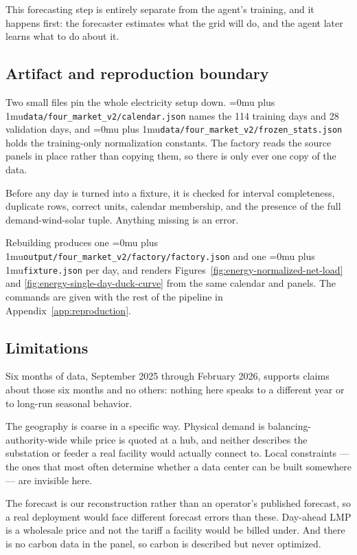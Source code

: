 ﻿\documentclass[12pt]{article}
\newcommand{\codepath}[1]{{\Urlmuskip=0mu plus 1mu\relax\nolinkurl{#1}}}
\begin{document}
This forecasting step is entirely separate from the agent's training, and it
happens first: the forecaster estimates what the grid will do, and the agent
later learns what to do about it.

\subsection{Artifact and reproduction boundary}
\label{subsec:energy-reproduction}

Two small files pin the whole electricity setup down.
\codepath{data/four_market_v2/calendar.json} names the 114 training days and 28
validation days, and \codepath{data/four_market_v2/frozen_stats.json} holds the
training-only normalization constants. The factory reads the source panels
in place rather than copying them, so there is only ever one copy of the data.

Before any day is turned into a fixture, it is checked for interval
completeness, duplicate rows, correct units, calendar membership, and the
presence of the full demand-wind-solar tuple. Anything missing is an error.

Rebuilding produces one
\codepath{output/four_market_v2/factory/factory.json} and one
\codepath{fixture.json} per day, and renders
Figures~\ref{fig:energy-normalized-net-load} and
\ref{fig:energy-single-day-duck-curve} from the same calendar and panels. The
commands are given with the rest of the pipeline in
Appendix~\ref{app:reproduction}.

\subsection{Limitations}
\label{subsec:energy-limitations}

Six months of data, September 2025 through February 2026, supports claims about
those six months and no others: nothing here speaks to a different year or to
long-run seasonal behavior.

The geography is coarse in a specific way. Physical demand is
balancing-authority-wide while price is quoted at a hub, and neither describes
the substation or feeder a real facility would actually connect to. Local
constraints --- the ones that most often determine whether a data center can be
built somewhere --- are invisible here.

The forecast is our reconstruction rather than an operator's published forecast,
so a real deployment would face different forecast errors than these. Day-ahead
LMP is a wholesale price and not the tariff a facility would be billed under.
And there is no carbon data in the panel, so carbon is described but never
optimized.
\end{document}
